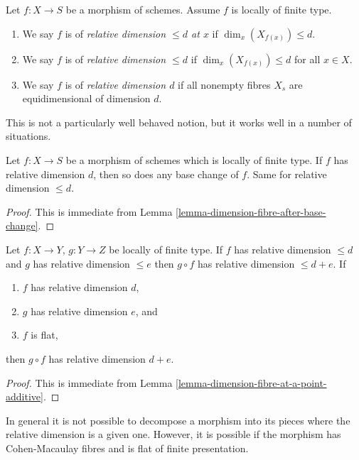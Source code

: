 \begin{definition}
\label{definition-relative-dimension-d}
Let $f : X \to S$ be a morphism of schemes.
Assume $f$ is locally of finite type.
\begin{enumerate}
\item We say $f$ is of {\it relative dimension $\leq d$ at $x$} if
$\dim_x(X_{f(x)}) \leq d$.
\item We say $f$ is of {\it relative dimension $\leq d$} if
$\dim_x(X_{f(x)}) \leq d$ for all $x \in X$.
\item We say $f$ is of {\it relative dimension $d$} if
all nonempty fibres $X_s$ are equidimensional of dimension $d$.
\end{enumerate}
\end{definition}

\noindent
This is not a particularly well behaved notion, but it works well
in a number of situations.

\begin{lemma}
\label{lemma-base-change-relative-dimension-d}
Let $f : X \to S$ be a morphism of schemes which is locally of finite type.
If $f$ has relative dimension $d$, then so does any base change of $f$.
Same for relative dimension $\leq d$.
\end{lemma}

\begin{proof}
This is immediate from
Lemma \ref{lemma-dimension-fibre-after-base-change}.
\end{proof}

\begin{lemma}
\label{lemma-composition-relative-dimension-d}
Let $f : X \to Y$, $g : Y \to Z$ be locally of finite type.
If $f$ has relative dimension $\leq d$ and $g$ has relative dimension $\leq e$
then $g \circ f$ has relative dimension $\leq d + e$.
If
\begin{enumerate}
\item $f$ has relative dimension $d$,
\item $g$ has relative dimension $e$, and
\item $f$ is flat,
\end{enumerate}
then $g \circ f$ has relative dimension $d + e$.
\end{lemma}

\begin{proof}
This is immediate from Lemma \ref{lemma-dimension-fibre-at-a-point-additive}.
\end{proof}

\noindent
In general it is not possible to decompose a morphism
into its pieces where the relative dimension is a given
one. However, it is possible if the morphism has Cohen-Macaulay
fibres and is flat of finite presentation.

